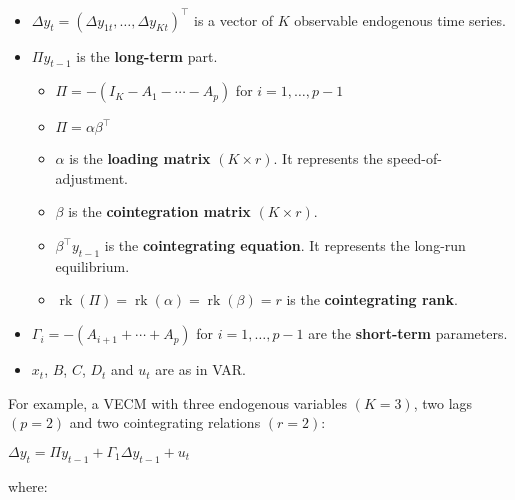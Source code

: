 \documentclass[10pt, a4paper, landscape]{article}
\DeclareMathOperator{\rk}{rk}
\begin{document}
\begin{multicols}{2}
\begin{itemize}[leftmargin=*]
	\item \( \Delta y_{t} = (\Delta y_{1t}, \ldots, \Delta y_{Kt})^{\top} \) is a vector of \( K \) observable endogenous time series.
	\item \( \Pi y_{t - 1} \) is the \textbf{long-term} part.
	\begin{itemize}[leftmargin=*, label={\( \diamond \)}]
		\item \( \Pi = - (I_{K} - A_{1} - \cdots - A_{p}) \) for \( i = 1, \ldots, p - 1 \)
		\item \( \Pi = \alpha \beta^{\top} \)
		\item \( \alpha \) is the \textbf{loading matrix} \( (K \times r) \). It represents the speed-of-adjustment.
		\item \( \beta \) is the \textbf{cointegration matrix} \( (K \times r) \).
		\item \( \beta^{\top} y_{t - 1} \) is the \textbf{cointegrating equation}. It represents the long-run equilibrium.
		\item \( \rk(\Pi) = \rk(\alpha) = \rk(\beta) = r \) is the \textbf{cointegrating rank}.
	\end{itemize}
	\item \( \Gamma_{i} = - (A_{i + 1} + \cdots + A_{p}) \) for \( i = 1, \ldots, p - 1 \) are the \textbf{short-term} parameters.
	\item \( x_{t} \), \( B \), \( C \), \( D_{t} \) and \( u_{t} \) are as in VAR.
\end{itemize}

For example, a VECM with three endogenous variables \( (K = 3) \), two lags \( (p = 2) \) and two cointegrating relations \( (r = 2) \):

\begin{center}
	\( \Delta y_{t} = \Pi y_{t - 1} + \Gamma_{1} \Delta y_{t - 1} + u_{t} \)
\end{center}

\quad where:


\end{multicols}
\end{document}
